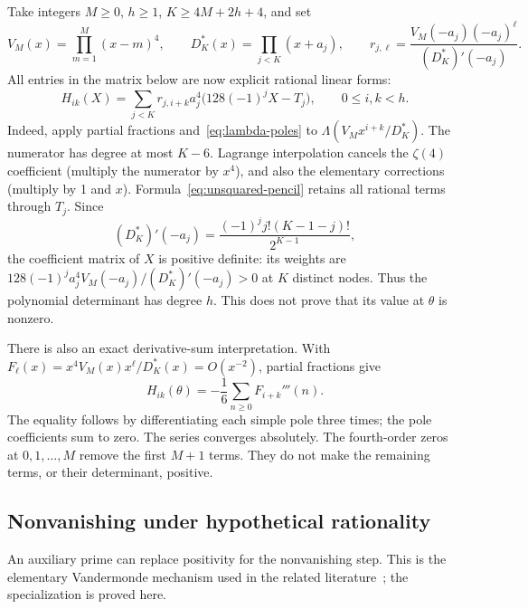Take integers $M\geq0$, $h\geq1$, $K\geq4M+2h+4$, and set
\[
 V_M(x)=\prod_{m=1}^M(x-m)^4,\qquad
 D_K^*(x)=\prod_{j<K}(x+a_j),\qquad
 r_{j,\ell}=\frac{V_M(-a_j)(-a_j)^\ell}{(D_K^*)'(-a_j)}.
\]
All entries in the matrix below are now explicit rational linear forms:
\begin{equation}\label{eq:unsquared-pencil}
 H_{ik}(X)=\sum_{j<K}r_{j,i+k}a_j^4\bigl(128(-1)^jX-T_j\bigr),
       \qquad 0\leq i,k<h.
\end{equation}
Indeed, apply partial fractions and~\eqref{eq:lambda-poles} to
$\Lambda(V_Mx^{i+k}/D_K^*)$. The numerator has degree at most $K-6$.
Lagrange interpolation cancels the $\zeta(4)$ coefficient (multiply
the numerator by $x^4$), and also the elementary corrections
(multiply by 1 and $x$). Formula~\eqref{eq:unsquared-pencil} retains
all rational terms through $T_j$.
Since
\[
 (D_K^*)'(-a_j)=\frac{(-1)^j j!(K-1-j)!}{2^{K-1}},
\]
the coefficient matrix of $X$ is positive definite: its weights are
$128(-1)^ja_j^4V_M(-a_j)/(D_K^*)'(-a_j)>0$ at $K$ distinct nodes.
Thus the polynomial determinant has degree $h$. This does not prove
that its value at $\theta$ is nonzero.

There is also an exact derivative-sum interpretation. With
$F_\ell(x)=x^4V_M(x)x^\ell/D_K^*(x)=O(x^{-2})$,
partial fractions give
\begin{equation}\label{eq:unsquared-derivative}
 H_{ik}(\theta)=-\frac16\sum_{n\geq0}F_{i+k}'''(n).
\end{equation}
The equality follows by differentiating each simple pole three times;
the pole coefficients sum to zero. The series converges absolutely.
The fourth-order zeros at $0,1,\ldots,M$ remove the first $M+1$ terms.
They do not make the remaining terms, or their determinant, positive.

\subsection{Nonvanishing under hypothetical rationality}
An auxiliary prime can replace positivity for the nonvanishing step.
This is the elementary Vandermonde mechanism used in the related
literature~\cite[Section 3]{Lai}; the specialization is proved here.

